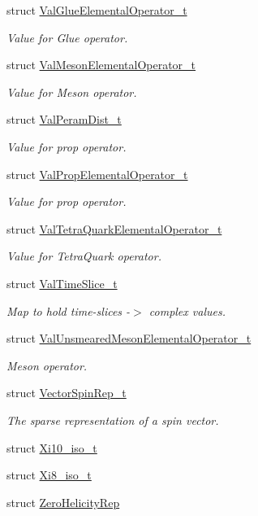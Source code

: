 \begin{DoxyCompactItemize}
struct \mbox{\hyperlink{structHadron_1_1ValGlueElementalOperator__t}{Val\+Glue\+Elemental\+Operator\+\_\+t}}
\begin{DoxyCompactList}\small\item\em Value for Glue operator. \end{DoxyCompactList}\item 
struct \mbox{\hyperlink{structHadron_1_1ValMesonElementalOperator__t}{Val\+Meson\+Elemental\+Operator\+\_\+t}}
\begin{DoxyCompactList}\small\item\em Value for Meson operator. \end{DoxyCompactList}\item 
struct \mbox{\hyperlink{structHadron_1_1ValPeramDist__t}{Val\+Peram\+Dist\+\_\+t}}
\begin{DoxyCompactList}\small\item\em Value for prop operator. \end{DoxyCompactList}\item 
struct \mbox{\hyperlink{structHadron_1_1ValPropElementalOperator__t}{Val\+Prop\+Elemental\+Operator\+\_\+t}}
\begin{DoxyCompactList}\small\item\em Value for prop operator. \end{DoxyCompactList}\item 
struct \mbox{\hyperlink{structHadron_1_1ValTetraQuarkElementalOperator__t}{Val\+Tetra\+Quark\+Elemental\+Operator\+\_\+t}}
\begin{DoxyCompactList}\small\item\em Value for Tetra\+Quark operator. \end{DoxyCompactList}\item 
struct \mbox{\hyperlink{structHadron_1_1ValTimeSlice__t}{Val\+Time\+Slice\+\_\+t}}
\begin{DoxyCompactList}\small\item\em Map to hold time-\/slices -\/$>$ complex values. \end{DoxyCompactList}\item 
struct \mbox{\hyperlink{structHadron_1_1ValUnsmearedMesonElementalOperator__t}{Val\+Unsmeared\+Meson\+Elemental\+Operator\+\_\+t}}
\begin{DoxyCompactList}\small\item\em Meson operator. \end{DoxyCompactList}\item 
struct \mbox{\hyperlink{structHadron_1_1VectorSpinRep__t}{Vector\+Spin\+Rep\+\_\+t}}
\begin{DoxyCompactList}\small\item\em The sparse representation of a spin vector. \end{DoxyCompactList}\item 
struct \mbox{\hyperlink{structHadron_1_1Xi10__iso__t}{Xi10\+\_\+iso\+\_\+t}}
\item 
struct \mbox{\hyperlink{structHadron_1_1Xi8__iso__t}{Xi8\+\_\+iso\+\_\+t}}
\item 
struct \mbox{\hyperlink{structHadron_1_1ZeroHelicityRep}{Zero\+Helicity\+Rep}}
\end{DoxyCompactItemize}
